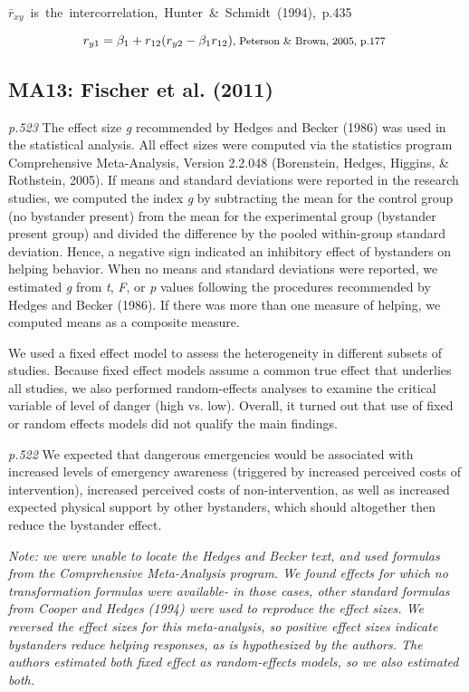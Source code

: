 \documentclass{article}
\begin{document}
\mbox{\footnotesize $\bar{r}_{xy}$ is the intercorrelation, Hunter \& Schmidt (1994), p.435 }

\begin{equation*}
r_{y1} = \beta_{1} + r_{12}(r_{y2}-\beta_{1}r_{12}) \mbox{\footnotesize, Peterson \& Brown, 2005, p.177 } 
\end{equation*}


\subsection*{MA13: Fischer et al. (2011)}

\textit{p.523} The effect size \textit{g} recommended by Hedges and Becker (1986) was used in the statistical analysis. All effect sizes were computed via the statistics program Comprehensive Meta-Analysis, Version 2.2.048 (Borenstein, Hedges, Higgins, \& Rothstein, 2005). If means and standard deviations were reported in the research
studies, we computed the index \textit{g} by subtracting the mean for the control group (no bystander present) from the mean for the experimental group (bystander present group) and divided the difference by the pooled within-group standard deviation. Hence, a negative sign indicated an inhibitory effect of bystanders on helping behavior. When no means and standard deviations were reported, we estimated \textit{g} from \textit{t}, \textit{F}, or \textit{p} values following the procedures recommended by Hedges and Becker (1986). If there was more than one measure of helping, we computed means as a composite measure.

We used a fixed effect model to assess the heterogeneity in different subsets of studies. Because fixed effect models assume a common true effect that underlies all studies, we also performed random-effects analyses to examine the critical variable of level of danger (high vs. low). Overall, it turned out that use of fixed or random effects models did not qualify the main findings.

\textit{p.522} We expected that dangerous emergencies would be associated with increased levels of emergency awareness (triggered by increased perceived costs of intervention), increased perceived costs of non-intervention, as well as increased expected physical support by other bystanders, which should altogether then reduce the bystander effect.

\vspace{3 mm}
\textit{Note: we were unable to locate the Hedges and Becker text, and used formulas from the Comprehensive Meta-Analysis program. We found effects for which no transformation formulas were available- in those cases, other standard formulas from Cooper and Hedges (1994) were used to reproduce the effect sizes. We reversed the effect sizes for this meta-analysis, so positive effect sizes indicate bystanders reduce helping responses, as is hypothesized by the authors. The authors estimated both fixed effect as random-effects models, so we also estimated both.}
\end{document}
